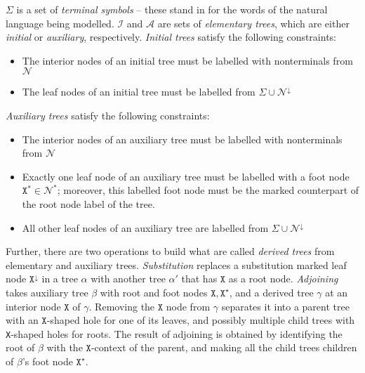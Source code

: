 $\Sigma$ is a set of \emph{terminal symbols} -- these stand in for the words of the natural language being modelled. $\mathcal{I}$ and $\mathcal{A}$ are sets of \emph{elementary trees}, which are either \emph{initial} or \emph{auxiliary}, respectively. \emph{Initial trees} satisfy the following constraints:

	\begin{itemize}
		\item{The interior nodes of an initial tree must be labelled with nonterminals from $\mathcal{N}$}
		\item{The leaf nodes of an initial tree must be labelled from $\Sigma \cup \mathcal{N}^{\downarrow}$}
	\end{itemize}
\emph{Auxiliary trees} satisfy the following constraints:
	\begin{itemize}
		\item{The interior nodes of an auxiliary tree must be labelled with nonterminals from $\mathcal{N}$}
		\item{Exactly one leaf node of an auxiliary tree must be labelled with a foot node $\texttt{X}^{*} \in \mathcal{N}^{*}$; moreover, this labelled foot node must be the marked counterpart of the root node label of the tree.}
		\item{All other leaf nodes of an auxiliary tree are labelled from $\Sigma \cup \mathcal{N}^{\downarrow}$}
	\end{itemize}

Further, there are two operations to build what are called \emph{derived trees} from elementary and auxiliary trees. \emph{Substitution} replaces a substitution marked leaf node $\texttt{X}^\downarrow$ in a tree $\alpha$ with another tree $\alpha'$ that has $\texttt{X}$ as a root node. \emph{Adjoining} takes auxiliary tree $\beta$ with root and foot nodes $\texttt{X},\texttt{X}^\star$, and a derived tree $\gamma$ at an interior node $\texttt{X}$ of $\gamma$. Removing the $\texttt{X}$ node from $\gamma$ separates it into a parent tree with an $\texttt{X}$-shaped hole for one of its leaves, and possibly multiple child trees with \texttt{X}-shaped holes for roots. The result of adjoining is obtained by identifying the root of $\beta$ with the $\texttt{X}$-context of the parent, and making all the child trees children of $\beta$'s foot node $\texttt{X}^\star$.

\newpage

